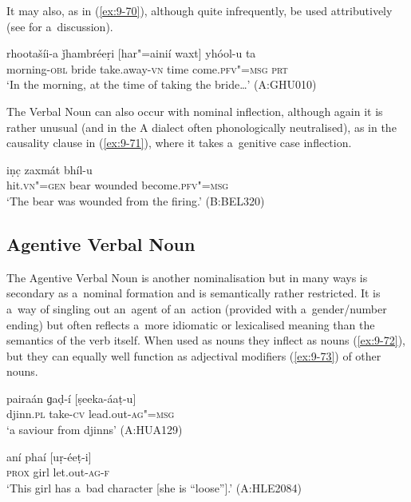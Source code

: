 It may also, as in (\ref{ex:9-70}), although quite infrequently, be used attributively (see  for a~discussion).

\begin{exe}
\ex
\label{ex:9-70}
\gll rhootašíi-a ǰhambréeṛi [har"=ainií waxt] yhóol-u ta \\
morning-\textsc{obl} bride take.away-\textsc{vn} time come.\textsc{pfv"=msg} \textsc{prt} \\
\glt `In the morning, at the time of taking the bride{\ldots}' (A:GHU010)
\end{exe}

The Verbal Noun can also occur with nominal inflection, although again it is rather unusual (and in the A dialect often phonologically neutralised), as in the causality clause in (\ref{ex:9-71}), where it takes a~genitive case inflection. 

\begin{exe}
\ex
\label{ex:9-71}
\gll [ǰeníi-e] iṇc̣ zaxmát bhíl-u \\
hit.\textsc{vn"=gen} bear wounded become.\textsc{pfv"=msg} \\
\glt `The bear was wounded from the firing.' (B:BEL320)
\end{exe}

\subsection{Agentive Verbal Noun}
\label{subsec:9-3-4}


The Agentive Verbal Noun is another nominalisation but in many ways is secondary as a~nominal formation and is semantically rather restricted. It is a~way of singling out an~agent of an~action (provided with a~gender/number ending) but often reflects a~more idiomatic or lexicalised meaning than the semantics of the verb itself. When used as nouns they inflect as nouns (\ref{ex:9-72}), but they can equally well function as adjectival modifiers (\ref{ex:9-73}) of other nouns.

\begin{exe}
\ex
\label{ex:9-72}
\gll pairaán ɡaḍ-í [ṣeeka-áaṭ-u] \\
djinn.\textsc{pl} take-\textsc{cv} lead.out-\textsc{ag"=msg} \\
\glt `a saviour from djinns' (A:HUA129)

\ex
\label{ex:9-73}
\gll aní phaí [uṛ-éeṭ-i] \\
\textsc{prox} girl let.out-\textsc{ag-f} \\
\glt `This girl has a~bad character [she is ``loose''].' (A:HLE2084)
\end{exe}

